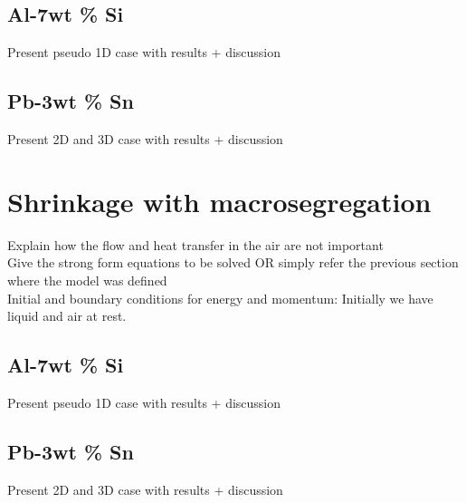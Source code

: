 \subsection{Al-7wt \% Si}
Present pseudo 1D case with results + discussion
\subsection{Pb-3wt \% Sn}
Present 2D and 3D case with results + discussion
\section{Shrinkage with macrosegregation}
Explain how the flow and heat transfer in the air are not important \\ 
Give the strong form equations to be solved OR simply refer the previous section where the model was defined \\
Initial and boundary conditions for energy and momentum:  Initially we have liquid and air at rest. 
\subsection{Al-7wt \% Si}
Present pseudo 1D case with results + discussion
\subsection{Pb-3wt \% Sn}
Present 2D and 3D case with results + discussion

